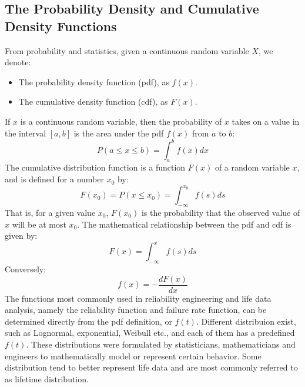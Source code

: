 \subsection{The Probability Density and Cumulative Density Functions}
From probability and statistics, given a continuous random variable $X$, we denote:
\begin{itemize}
	\item The probability density function (pdf), as $f(x)$.
	\item The cumulative density function (cdf), as $F(x)$.
\end{itemize}
If $x$ is a continuous random variable, then the probability of $x$ takes on a value in the
interval $[a,b]$ is the area under the pdf $f(x)$ from $a$ to $b$:
\begin{equation}
  P(a\leq x\leq b) = \int_{a}^{b} f(x)dx
\end{equation}
The cumulative distribution function is a function $F(x)$ of a random variable $x$, and is
defined for a number $x_0$ by:
\begin{equation}
  F(x_0) = P(x\leq x_0) = \int_{-\infty}^{x_0} f(s)ds
\end{equation}
That is, for a given value $x_0$, $F(x_0)$ is the probability that the observed value of $x$
will be at most $x_0$. The mathematical relationship between the pdf and cdf is given by:
\begin{equation}
  F(x) = \int_{-\infty}^{x} f(s)ds
\end{equation}
Conversely:
\begin{equation}
  f(x) = - \frac{dF(x)}{dx}
\end{equation}
The functions most commonly used in reliability engineering and life data analysis, namely the
reliability function and failure rate function, can be determined directly from the pdf definition,
or $f(t)$. Different distribuion exist, such as Lognormal, exponential, Weibull etc., and each of
them has a predefined $f(t)$. These distributions were formulated by statisticians, mathematicians
and engineers to mathematically model or represent certain behavior. Some distribution tend to better
represent life data and are most commonly referred to as lifetime distribution.

